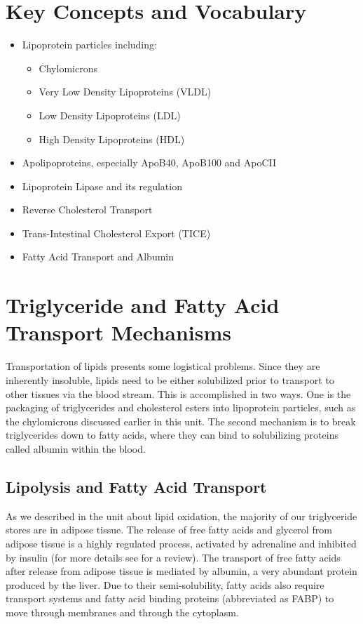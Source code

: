 \documentclass{tufte-handout}
\begin{document}
\section{Key Concepts and Vocabulary}

\begin{itemize}
	\item Lipoprotein particles including:
	\begin{itemize}
		\item Chylomicrons
		\item Very Low Density Lipoproteins (VLDL)
		\item Low Density Lipoproteins (LDL)
		\item High Density Lipoproteins (HDL)
	\end{itemize}
	\item Apolipoproteins, especially ApoB40, ApoB100 and ApoCII
	\item Lipoprotein Lipase and its regulation
	\item Reverse Cholesterol Transport
	\item Trans-Intestinal Cholesterol Export (TICE)
	\item Fatty Acid Transport and Albumin
\end{itemize}

\section{Triglyceride and Fatty Acid Transport Mechanisms}

Transportation of lipids presents some logistical problems.  Since they are inherently insoluble, lipids need to be either solubilized prior to transport to other tissues via the blood stream.  This is accomplished in two ways.  One is the packaging of triglycerides and cholesterol esters into lipoprotein particles, such as the chylomicrons discussed earlier in this unit.  The second mechanism is to break triglycerides down to fatty acids, where they can bind to solubilizing proteins called albumin within the blood.

\subsection{Lipolysis and Fatty Acid Transport}

As we described in the unit about lipid oxidation, the majority of our triglyceride stores are in adipose tissue.  The release of free fatty acids and glycerol from adipose tissue is a highly regulated process, activated by adrenaline and inhibited by insulin (for more details see \citet{Zechner2012} for a review).  The transport of free fatty acids after release from adipose tissue is mediated by albumin, a very abundant protein produced by the liver.  Due to their semi-solubility, fatty acids also require transport systems and fatty acid binding proteins (abbreviated as FABP) to move through membranes and through the cytoplasm.
\end{document}
